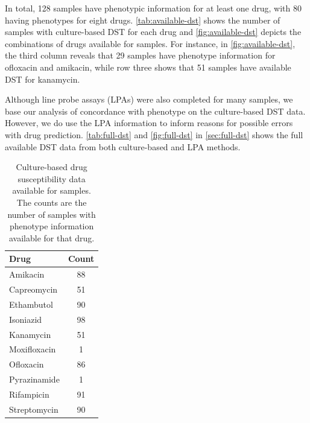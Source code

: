 \noindent
In total, 128 samples have phenotypic information for at least one drug, with 80 having phenotypes for eight drugs. \autoref{tab:available-dst} shows the number of samples with culture-based DST for each drug and \autoref{fig:available-dst} depicts the combinations of drugs available for samples. For instance, in \autoref{fig:available-dst}, the third column reveals that 29 samples have phenotype information for ofloxacin and amikacin, while row three shows that 51 samples have available DST for kanamycin. 

Although line probe assays (LPAs) were also completed for many samples, we base our analysis of concordance with phenotype on the culture-based DST data. However, we do use the LPA information to inform reasons for possible errors with drug prediction. \autoref{tab:full-dst} and \autoref{fig:full-dst} in \autoref{sec:full-dst} shows the full available DST data from both culture-based and LPA methods.

\begin{table}
\centering
\begin{tabular}{|l|c|}
\hline
Drug         & Count \\ \hline
Amikacin     & 88    \\ \hline
Capreomycin  & 51    \\ \hline
Ethambutol   & 90    \\ \hline
Isoniazid    & 98    \\ \hline
Kanamycin    & 51    \\ \hline
Moxifloxacin & 1     \\ \hline
Ofloxacin    & 86    \\ \hline
Pyrazinamide & 1     \\ \hline
Rifampicin   & 91    \\ \hline
Streptomycin & 90    \\ \hline
\end{tabular}
\caption{Culture-based drug susceptibility data available for samples. The counts are the number of samples with phenotype information available for that drug.}
\label{tab:available-dst}
\end{table}

